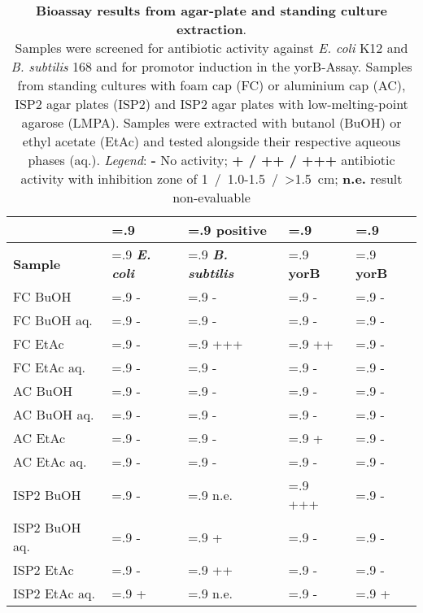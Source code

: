     \begin{table}[htbp]
        \caption[Bioassay results from agar-plate and standing culture extraction]{\textbf{Bioassay results from agar-plate and standing culture extraction}.\\
        Samples were screened for antibiotic activity against \textit{E. coli} K12 and \textit{B. subtilis} 168 and for promotor induction in the yorB-Assay.
        Samples from standing cultures with foam cap (FC) or aluminium cap (AC), ISP2 agar plates (ISP2) and ISP2 agar plates with low-melting-point agarose (LMPA). Samples were extracted with butanol (BuOH) or ethyl acetate (EtAc) and tested alongside their respective aqueous phases (aq.). \emph{Legend}: \textbf{-} No activity; \textbf{+ / ++ / +++} antibiotic activity with inhibition zone of 1~/~1.0-1.5~/~>1.5~cm; \textbf{n.e.} result non-evaluable}
        \label{tab:yorB_assay_results}
        \centering
        \begin{tabularx}{\textwidth}{>{\hsize=1.4\hsize}X>{\hsize=.9\hsize}X>{\hsize=.9\hsize}X>{\hsize=.9\hsize}X>{\hsize=.9\hsize}X}
            \toprule
            & \multicolumn{3}{c}{Antibacterial} & positive \\
            \cline{2-4}
            \textbf{Sample} & \textbf{\textit{E. coli}}     & \textbf{\textit{B. subtilis}}  & \textbf{yorB}  & \textbf{yorB}    \\
            \midrule
            FC BuOH         & -     & -     & -     & -    \\
            FC BuOH aq.     & -     & -     & -     & -    \\
            FC EtAc         & -     & +++   & ++    & -    \\
            FC EtAc aq.     & -     & -     & -     & -    \\
            AC BuOH         & -     & -     & -     & -    \\
            AC BuOH aq.     & -     & -     & -     & -    \\
            AC EtAc         & -     & -     & +     & -    \\
            AC EtAc aq.     & -     & -     & -     & -    \\
            \midrule
            ISP2 BuOH       & -     & n.e.  & +++   & -    \\
            ISP2 BuOH aq.   & -     & +     & -     & -    \\
            ISP2 EtAc       & -     & ++    & -     & -    \\
            ISP2 EtAc aq.   & +     & n.e.  & -     & +    \\

\end{tabularx}
\end{table}
